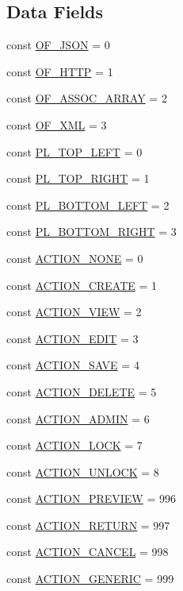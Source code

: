 \subsection*{Data Fields}
\begin{DoxyCompactItemize}
\item 
const \hyperlink{classCPSHelperBase_ae216f8dc124162fce9c831581cccad38}{OF\_\-JSON} = 0
\item 
const \hyperlink{classCPSHelperBase_ad861d7e1882caed33177c62354962537}{OF\_\-HTTP} = 1
\item 
const \hyperlink{classCPSHelperBase_a9976081cc6341d651113d98adf880a7c}{OF\_\-ASSOC\_\-ARRAY} = 2
\item 
const \hyperlink{classCPSHelperBase_a3a27aba2d308cba737ac8177f210b547}{OF\_\-XML} = 3
\item 
const \hyperlink{classCPSHelperBase_ac77237b0fcb9d6540fca4eb80f4487f8}{PL\_\-TOP\_\-LEFT} = 0
\item 
const \hyperlink{classCPSHelperBase_ab2d49310ee456748bb800d490fcc9e89}{PL\_\-TOP\_\-RIGHT} = 1
\item 
const \hyperlink{classCPSHelperBase_a01a4f4dcd309a862d2489734b17b6d29}{PL\_\-BOTTOM\_\-LEFT} = 2
\item 
const \hyperlink{classCPSHelperBase_ac1425b823028e19f350a752e8bb08000}{PL\_\-BOTTOM\_\-RIGHT} = 3
\item 
const \hyperlink{classCPSHelperBase_a14ebb74e919040ff6ae640a85e26ad80}{ACTION\_\-NONE} = 0
\item 
const \hyperlink{classCPSHelperBase_a9c06ab2db927f3b687a12bf1bed808cd}{ACTION\_\-CREATE} = 1
\item 
const \hyperlink{classCPSHelperBase_a264a8a0ead2c258c6ad9ce0f0968cd1b}{ACTION\_\-VIEW} = 2
\item 
const \hyperlink{classCPSHelperBase_ab9acf282db5918a797e09e1fa108ae9e}{ACTION\_\-EDIT} = 3
\item 
const \hyperlink{classCPSHelperBase_a4f9b91b9d04c6c9d7b6ebb8ceb70c0c0}{ACTION\_\-SAVE} = 4
\item 
const \hyperlink{classCPSHelperBase_a274e654ac39438f682f6bf1eb450395e}{ACTION\_\-DELETE} = 5
\item 
const \hyperlink{classCPSHelperBase_a40afbdc229854c77e24353b459713784}{ACTION\_\-ADMIN} = 6
\item 
const \hyperlink{classCPSHelperBase_af1b57d540e52e105bcb81d4482546cba}{ACTION\_\-LOCK} = 7
\item 
const \hyperlink{classCPSHelperBase_ae24b4d0d3bf45c296468bccbfb12a13b}{ACTION\_\-UNLOCK} = 8
\item 
const \hyperlink{classCPSHelperBase_a4bd6b76d55b3a5f5cecaaf7489dbcd88}{ACTION\_\-PREVIEW} = 996
\item 
const \hyperlink{classCPSHelperBase_a6954c10c63953015a160f802f79e59d2}{ACTION\_\-RETURN} = 997
\item 
const \hyperlink{classCPSHelperBase_a03e2e4af94065db773598c46a3d457f8}{ACTION\_\-CANCEL} = 998
\item 
const \hyperlink{classCPSHelperBase_ab18109cf2120c7f61450d656a4700fff}{ACTION\_\-GENERIC} = 999
\end{DoxyCompactItemize}

